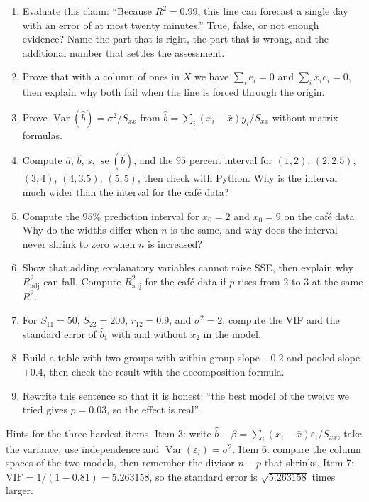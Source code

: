 \begin{latihan}
\begin{enumerate}
  \item Evaluate this claim: ``Because $R^2=0.99$, this line can forecast a single day with an
        error of at most twenty minutes.'' True, false, or not enough evidence? Name the part
        that is right, the part that is wrong, and the additional number that settles the
        assessment.
  \item Prove that with a column of ones in $X$ we have $\sum_i e_i=0$ and
        $\sum_i x_ie_i=0$, then explain why both fail when the line is forced through the
        origin.
  \item Prove $\operatorname{Var}(\hat b)=\sigma^2/S_{xx}$ from
        $\hat b=\sum_i(x_i-\bar x)y_i/S_{xx}$ without matrix formulas.
  \item Compute $\hat a$, $\hat b$, $s$, $\operatorname{se}(\hat b)$, and the $95$ percent
        interval for $(1,2)$, $(2,2.5)$, $(3,4)$, $(4,3.5)$, $(5,5)$, then check with Python. Why
        is the interval much wider than the interval for the café data?
  \item Compute the $95\%$ prediction interval for $x_0=2$ and $x_0=9$ on the café data.
        Why do the widths differ when $n$ is the same, and why does the interval never
        shrink to zero when $n$ is increased?
  \item Show that adding explanatory variables cannot raise SSE, then explain why
        $R^2_{\text{adj}}$ can fall. Compute $R^2_{\text{adj}}$ for the café data if $p$ rises
        from $2$ to $3$ at the same $R^2$.
  \item For $S_{11}=50$, $S_{22}=200$, $r_{12}=0.9$, and $\sigma^2=2$, compute the VIF and the
        standard error of $\hat b_1$ with and without $x_2$ in the model.
  \item Build a table with two groups with within-group slope $-0.2$ and pooled slope $+0.4$,
        then check the result with the decomposition formula.
  \item Rewrite this sentence so that it is honest: ``the best model of the twelve we tried gives
        $p=0.03$, so the effect is real''.
\end{enumerate}

Hints for the three hardest items. Item 3: write
$\hat b-\beta=\sum_i(x_i-\bar x)\varepsilon_i/S_{xx}$, take the variance, use independence and
$\operatorname{Var}(\varepsilon_i)=\sigma^2$. Item 6: compare the column spaces of the two
models, then remember the divisor $n-p$ that shrinks. Item 7: $\mathrm{VIF}=1/(1-0.81)=5.263158$,
so the standard error is $\sqrt{5.263158}$ times larger.
\end{latihan}

